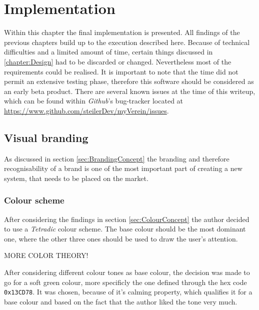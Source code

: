 \chapter{Implementation}
\label{chapter:Implementation}
Within this chapter the final implementation is presented. All findings of the previous chapters build up to the execution described here. Because of technical difficulties and a limited amount of time, certain things discussed in \vref{chapter:Design} had to be discarded or changed. Nevertheless most of the requirements could be realised. It is important to note that the time did not permit an extensive testing phase, therefore this software should be considered as an early beta product. There are several known issues at the time of this writeup, which can be found within \emph{Github}'s bug-tracker located at \url{https://www.github.com/steilerDev/myVerein/issues}.

\section{Visual branding}
\label{sec:BrandingImplementation}
As discussed in section \vref{sec:BrandingConcept} the branding and therefore recognisability of a brand is one of the most important part of creating a new system, that needs to be placed on the market. 

\subsection{Colour scheme}
After considering the findings in section \vref{sec:ColourConcept} the author decided to use a \emph{Tetradic} colour scheme. The base colour should be the most dominant one, where the other three ones should be used to draw the user's attention. 


MORE COLOR THEORY!

After considering different colour tones as base colour, the decision was made to go for a soft green colour, more specificly the one defined through the hex code \texttt{0x13CD78}. It was chosen, because of it's calming property, which qualifies it for a base colour and based on the fact that the author liked the tone very much.

